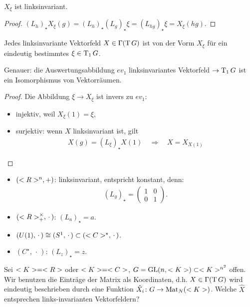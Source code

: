 \begin{lemma}
	$X_\xi$ ist linksinvariant.
\end{lemma}
\begin{proof}
	$(L_h)_\star X_\xi(g) = (L_h)_\star (L_g)_\star \xi = (L_{hg})_\star \xi = X_\xi (hg)$.
\end{proof}

\begin{lemma}
	Jedes linksinvariante Vektorfeld $X\in\Gamma(\operatorname{T} G)$ ist von der Vorm $X_\xi$ für ein eindeutig bestimmtes $\xi\in \operatorname{T}_1 G$.
	
	Genauer: die Auswertungsabbildung $ev_1$ {linksinvariantes Vektorfeld} $\to \operatorname{T}_1 G$ ist ein Isomorphismus von Vektorräumen.
\end{lemma}
\begin{proof}
	Die Abbildung $\xi\to X_\xi$ ist invers zu $ev_1$:\begin{itemize}
		\item injektiv, weil $X_\xi(1)=\xi$,
		\item surjektiv: wenn $X$ linksinvariant ist, gilt \begin{align*}
			X(g) = (L_\xi)_\star X(1)\quad\Rightarrow\quad X=X_{X(1)}
		\end{align*}
	\end{itemize}
\end{proof}

\begin{example}
	\begin{itemize}
		\item $(<R>^n,+)$: linksinvariant, entspricht konstant, denn: \begin{align*}
			(L_g)_\star = \begin{pmatrix}
				1 & 0 \\ 0 & 1
			\end{pmatrix}.
		\end{align*}
		\item $(<R>_+^\times,\,\cdot\,)$: $(L_a)_\star = a$.
		\item $(U(1),\,\cdot\,)\cong (S^1,\,\cdot\,)\subset (<C>^\star,\,\cdot\,)$.
		\item $(C^\star,\,\cdot\,)$: $(L_z)_\star = z$.
	\end{itemize}
\end{example}

Sei $<K>=<R>$ oder $<K>=<C>$, $G=\operatorname{GL}(n,<K>)\subset<K>^{n^2}$ offen. Wir benutzen die Einträge der Matrix als Koordinaten, d.h. $X\in\Gamma(\operatorname{T} G)$ wird eindeutig beschrieben durch eine Funktion $\hat X_i\colon G\to\operatorname{Mat}_N(<K>)$. Welche $\hat X$ entsprechen links-invarianten Vektorfeldern?

